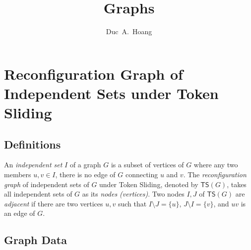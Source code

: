\documentclass[a4paper]{article}
\title{}
\author{}
\title{Graphs}
\author{Duc~A.~Hoang}
\theoremstyle{definition}
\theoremstyle{remark}
\numberwithin{equation}{section}
\begin{document}
\nocite{*}

\maketitle

%

\tableofcontents

\section{Reconfiguration Graph of Independent Sets under Token Sliding}

\subsection{Definitions}

An \textit{independent set} $I$ of a graph $G$ is a subset of vertices of $G$ where any two members $u, v \in I$, there is no edge of $G$ connecting $u$ and $v$.
The \textit{reconfiguration graph} of independent sets of $G$ under Token Sliding, denoted by $\mathsf{TS}(G)$, takes all independent sets of $G$ as its \textit{nodes (vertices)}.
Two nodes $I, J$ of $\mathsf{TS}(G)$ are \textit{adjacent} if there are two vertices $u, v$ such that $I \setminus J = \{u\}$, $J \setminus I = \{v\}$, and $uv$ is an edge of $G$.

\subsection{Graph Data}
\end{document}
